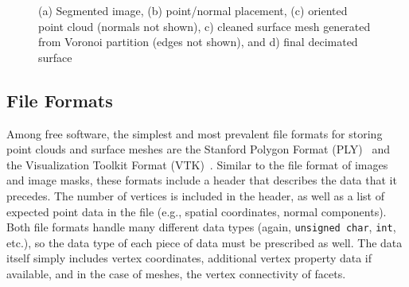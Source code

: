 \begin{figure}
{\label{fig:shabakaseq4}}
%
\caption{(a) Segmented image, (b) point/normal placement, (c) oriented point cloud (normals not shown), c) cleaned surface mesh generated from Voronoi partition (edges not shown), and d) final decimated surface}
\label{fig:shabakaseq}
\end{figure}

\subsection{File Formats}
\label{File Formats-SURF}

Among free software, the simplest and most prevalent file formats for storing point clouds and surface meshes are the Stanford Polygon Format (PLY)~\cite{ply} and the Visualization Toolkit Format (VTK)~\cite{vtk}. Similar to the file format of images and image masks, these formats include a header that describes the data that it precedes. The number of vertices is included in the header, as well as a list of expected point data in the file (e.g., spatial coordinates, normal components). Both file formats handle many different data types (again, \texttt{unsigned char}, \texttt{int}, etc.), so the data type of each piece of data must be prescribed as well. The data itself simply includes vertex coordinates, additional vertex property data if available, and in the case of meshes, the vertex connectivity of facets.

